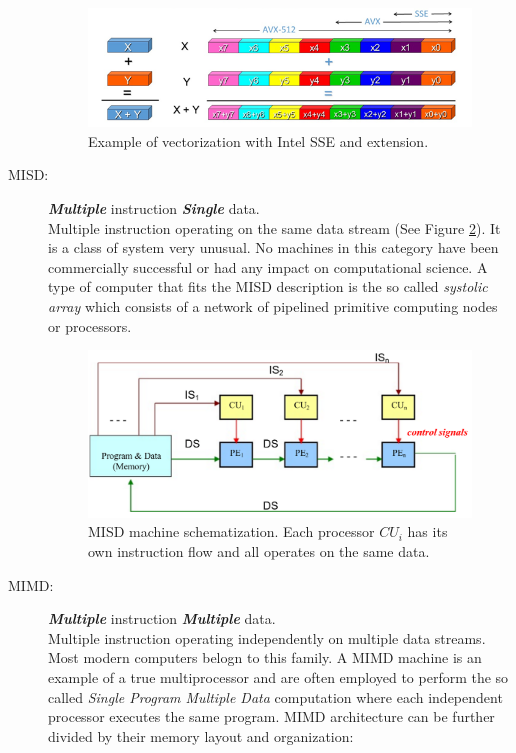 \begin{description}
\begin{figure}[!htbp]
	\centering
	\includegraphics[width=1.0\textwidth]{./images/parallel_programming/vectorization_example}
	\caption{Example of vectorization with Intel SSE and extension.}
	\label{fig:SSEvectorization}
\end{figure}

\item[MISD:] \textit{\textbf{Multiple}} instruction \textit{\textbf{Single}} data. \hfill \\ 
Multiple instruction operating on the same data stream  (See Figure \ref{fig:MISD}). It is a class of system very unusual. No machines in this category have been commercially successful or had any impact on computational science. 
A type of computer  that fits the MISD description is the so called \textit{systolic array} \cite{fortes:1987,kung:1984} which consists of a network of pipelined primitive computing nodes or processors. 
\begin{figure}[!htbp]
	\centering
	\includegraphics[width=1.0\textwidth]{./images/parallel_programming/MISD}
	\caption{MISD machine schematization. Each processor $CU_i$ has its own instruction flow and all operates on the same data.}
	\label{fig:MISD}
\end{figure}
 
\item[MIMD:] \textit{\textbf{Multiple}} instruction \textit{\textbf{Multiple}} data. \hfill \\ Multiple instruction operating
independently on multiple data streams. Most modern computers belogn to this family. A MIMD machine is an example of a true multiprocessor and are often employed to perform the so called \textit{Single Program Multiple Data} computation where each independent processor executes the same program.
MIMD architecture can be further divided by  their memory layout and organization:




\end{description}
